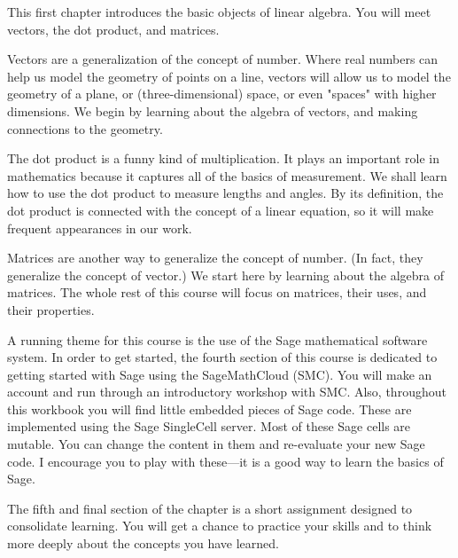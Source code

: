 \documentclass[10pt,]{book}
\theoremstyle{plain}
\theoremstyle{definition}
\numberwithin{equation}{section}
\begin{document}
      This first chapter introduces the basic objects of linear algebra.
      You will meet vectors, the dot product, and matrices.
\par

      Vectors are a generalization of the concept of number. Where real numbers
      can help us model the geometry of points on a line, vectors will allow us to
      model the geometry of a plane, or (three-dimensional) space, or even "spaces"
      with higher dimensions. We begin by learning about the algebra of vectors,
      and making connections to the geometry.
\par

      The dot product is a funny kind of multiplication. It plays an important
      role in mathematics because it captures all of the basics of measurement.
      We shall learn how to use the dot product to measure lengths and angles. By
      its definition, the dot product is connected with the concept of a linear
      equation, so it will make frequent appearances in our work.
\par

      Matrices are another way to generalize the concept of number. (In fact, they
      generalize the concept of vector.) We start here by learning about the
      algebra of matrices. The whole rest of this course will focus on matrices,
      their uses, and their properties.
\par

      A running theme for this course is the use of the Sage mathematical software
      system. In order to get started, the fourth section of this course is
      dedicated to getting started with Sage using the SageMathCloud (SMC). You will
      make an account and run through an introductory workshop with SMC.
      Also, throughout this workbook you will find little embedded pieces of Sage
      code. These are implemented using the Sage SingleCell server. Most of these
      Sage cells are mutable. You can change the content in them and re-evaluate
      your new Sage code. I encourage you to play with these---it is a good way to
      learn the basics of Sage.
\par

      The fifth and final section of the chapter is a short assignment designed to
      consolidate learning. You will get a chance to practice your skills and to
      think more deeply about the concepts you have learned.
\typeout{************************************************}
\typeout{************************************************}
\end{document}
